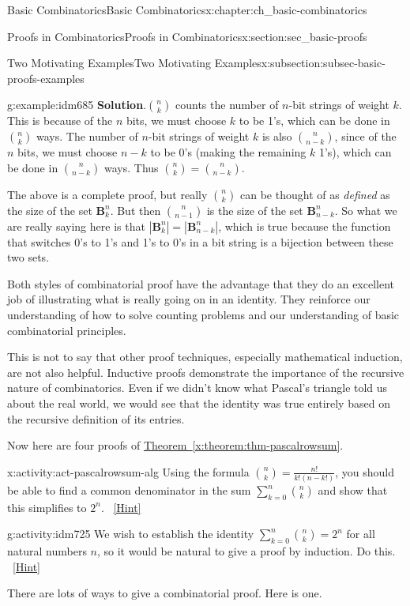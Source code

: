 \documentclass[oneside,10pt,]{book}
\numberwithin{equation}{chapter}
\def\B{\mathbf{B}}
\begin{document}
\begin{chapterptx}{Basic Combinatorics}{}{Basic Combinatorics}{}{}{x:chapter:ch_basic-combinatorics}
\begin{sectionptx}{Proofs in Combinatorics}{}{Proofs in Combinatorics}{}{}{x:section:sec_basic-proofs}
\begin{subsectionptx}{Two Motivating Examples}{}{Two Motivating Examples}{}{}{x:subsection:subsec-basic-proofs-examples}
\begin{example}{}{g:example:idm685}
\noindent\textbf{Solution}.\hypertarget{g:solution:idm689}{}\quad{}\(\binom{n}{k}\) counts the number of \(n\)-bit strings of weight \(k\).  This is because of the \(n\) bits, we must choose \(k\) to be 1's, which can be done in \(\binom{n}{k}\) ways.  The number of \(n\)-bit strings of weight \(k\) is also \(\binom{n}{n-k}\), since of the \(n\) bits, we must choose \(n-k\) to be 0's (making the remaining \(k\) 1's), which can be done in \(\binom{n}{n-k}\) ways.  Thus \(\binom{n}{k} = \binom{n}{n-k}\).%
\par
The above is a complete proof, but really \(\binom{n}{k}\) can be thought of as \emph{defined} as the size of the set \(\B^n_k\).  But then \(\binom{n}{n-1}\) is the size of the set \(\B^n_{n-k}\).  So what we are really saying here is that \(|\B^n_k| = |\B^n_{n-k}|\), which is true because the function that switches 0's to 1's and 1's to 0's in a bit string is a bijection between these two sets.%
\end{example}
Both styles of combinatorial proof have the advantage that they do an excellent job of illustrating what is really going on in an identity.  They reinforce our understanding of how to solve counting problems and our understanding of basic combinatorial principles.%
\par
This is not to say that other proof techniques, especially mathematical induction, are not also helpful.  Inductive proofs demonstrate the importance of the recursive nature of combinatorics.  Even if we didn't know what Pascal's triangle told us about the real world, we would see that the identity was true entirely based on the recursive definition of its entries.%
\par
Now here are four proofs of \hyperref[x:theorem:thm-pascalrowsum]{Theorem~\ref{x:theorem:thm-pascalrowsum}}.%
\begin{activity}{}{x:activity:act-pascalrowsum-alg}%
Using the formula \(\binom{n}{k} = \frac{n!}{k!(n-k!)}\), you should be able to find a common denominator in the sum \(\sum_{k=0}^n \binom{n}{k}\) and show that this simplifies to \(2^n\).%
\qquad~\hfill{\tiny\hyperlink{g:hint:idm722-back}{[Hint]}}\end{activity}
\begin{activity}{}{g:activity:idm725}%
We wish to establish the identity \(\sum_{k=0}^n \binom{n}{k} = 2^n\) for all natural numbers \(n\), so it would be natural to give a proof by induction.  Do this.%
\qquad~\hfill{\tiny\hyperlink{g:hint:idm730-back}{[Hint]}}\end{activity}
There are lots of ways to give a combinatorial proof.  Here is one.%

\end{subsectionptx}
\end{sectionptx}
\end{chapterptx}
\end{document}
